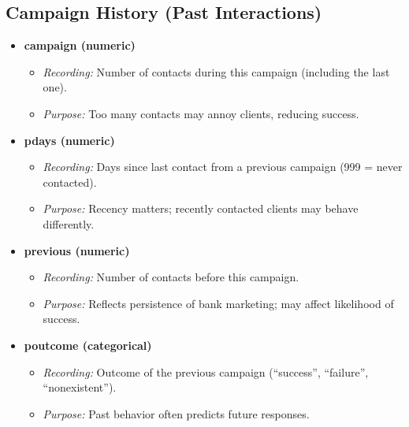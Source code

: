 \documentclass[
]{article}
\providecommand{\tightlist}{%
  \setlength{\itemsep}{0pt}\setlength{\parskip}{0pt}}
\begin{document}
\subsection{Campaign History (Past
Interactions)}\label{campaign-history-past-interactions}

\begin{itemize}
\tightlist
\item
  \textbf{campaign (numeric)}

  \begin{itemize}
  \tightlist
  \item
    \emph{Recording:} Number of contacts during this campaign (including
    the last one).\\
  \item
    \emph{Purpose:} Too many contacts may annoy clients, reducing
    success.
  \end{itemize}
\item
  \textbf{pdays (numeric)}

  \begin{itemize}
  \tightlist
  \item
    \emph{Recording:} Days since last contact from a previous campaign
    (999 = never contacted).\\
  \item
    \emph{Purpose:} Recency matters; recently contacted clients may
    behave differently.
  \end{itemize}
\item
  \textbf{previous (numeric)}

  \begin{itemize}
  \tightlist
  \item
    \emph{Recording:} Number of contacts before this campaign.\\
  \item
    \emph{Purpose:} Reflects persistence of bank marketing; may affect
    likelihood of success.
  \end{itemize}
\item
  \textbf{poutcome (categorical)}

  \begin{itemize}
  \tightlist
  \item
    \emph{Recording:} Outcome of the previous campaign (``success'',
    ``failure'', ``nonexistent'').\\
  \item
    \emph{Purpose:} Past behavior often predicts future responses.
  \end{itemize}
\end{itemize}
\end{document}
